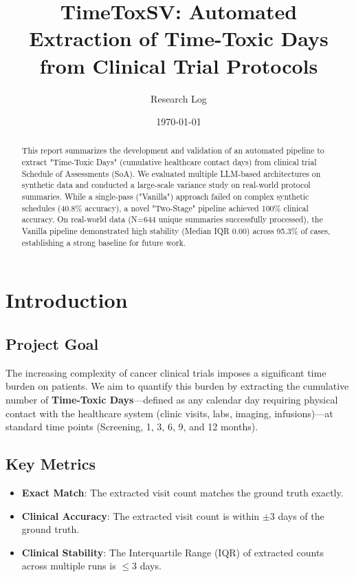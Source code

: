 \documentclass[11pt, a4paper]{article}
\title{\textbf{TimeToxSV: Automated Extraction of Time-Toxic Days from Clinical Trial Protocols}}
\author{Research Log}
\date{\today}
\begin{document}
\maketitle

\begin{abstract}
This report summarizes the development and validation of an automated pipeline to extract "Time-Toxic Days" (cumulative healthcare contact days) from clinical trial Schedule of Assessments (SoA). We evaluated multiple LLM-based architectures on synthetic data and conducted a large-scale variance study on real-world protocol summaries. While a single-pass ("Vanilla") approach failed on complex synthetic schedules (40.8\% accuracy), a novel "Two-Stage" pipeline achieved 100\% clinical accuracy. On real-world data (N=644 unique summaries successfully processed), the Vanilla pipeline demonstrated high stability (Median IQR 0.00) across 95.3\% of cases, establishing a strong baseline for future work.
\end{abstract}

\tableofcontents
\newpage

\section{Introduction}
\subsection{Project Goal}
The increasing complexity of cancer clinical trials imposes a significant time burden on patients. We aim to quantify this burden by extracting the cumulative number of \textbf{Time-Toxic Days}---defined as any calendar day requiring physical contact with the healthcare system (clinic visits, labs, imaging, infusions)---at standard time points (Screening, 1, 3, 6, 9, and 12 months).

\subsection{Key Metrics}
\begin{itemize}
    \item \textbf{Exact Match}: The extracted visit count matches the ground truth exactly.
    \item \textbf{Clinical Accuracy}: The extracted visit count is within $\pm 3$ days of the ground truth.
    \item \textbf{Clinical Stability}: The Interquartile Range (IQR) of extracted counts across multiple runs is $\le 3$ days.
\end{itemize}
\end{document}
